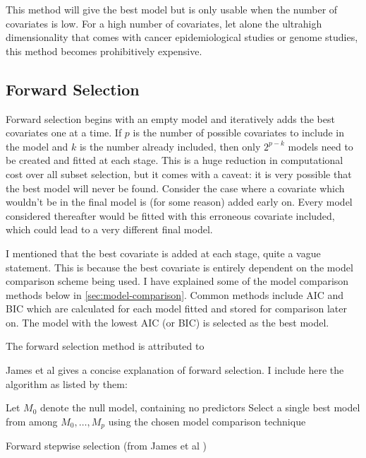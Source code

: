 This method will give the best model but is only usable when the number of covariates is low. For a high number of covariates, let alone the ultrahigh dimensionality that comes with cancer epidemiological studies or genome studies, this method becomes prohibitively expensive.

\subsection{Forward Selection}

Forward selection begins with an empty model and iteratively adds the best covariates one at a time. If $p$ is the number of possible covariates to include in the model and $k$ is the number already included, then only $2^{p-k}$ models need to be created and fitted at each stage. This is a huge reduction in computational cost over all subset selection, but it comes with a caveat: it is very possible that the best model will never be found. Consider the case where a covariate which wouldn't be in the final model is (for some reason) added early on. Every model considered thereafter would be fitted with this erroneous covariate included, which could lead to a very different final model.

I mentioned that the best covariate is added at each stage, quite a vague statement. This is because the best covariate is entirely dependent on the model comparison scheme being used. I have explained some of the model comparison methods below in \cref{sec:model-comparison}. Common methods include AIC and BIC which are calculated for each model fitted and stored for comparison later on. The model with the lowest AIC (or BIC) is selected as the best model.

The forward selection method is attributed to 

James et al  gives a concise explanation of forward selection. I include here the algorithm as listed by them:

\begin{algorithm}[H]
    Let $M_0$ denote the null model, containing no predictors\;
    Select a single best model from among $M_0,\ldots,M_p$ using the chosen model comparison technique\;
    \caption{Forward stepwise selection (from James et al )}\label{alg:forward-stepwise-selection}
\end{algorithm}

